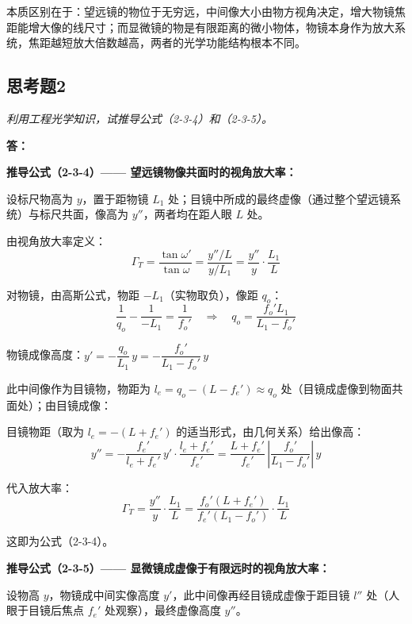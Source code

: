 \documentclass[12pt, a4paper]{article}
\begin{document}
本质区别在于：望远镜的物位于无穷远，中间像大小由物方视角决定，增大物镜焦距能增大像的线尺寸；而显微镜的物是有限距离的微小物体，物镜本身作为放大系统，焦距越短放大倍数越高，两者的光学功能结构根本不同。

\subsection*{思考题2}

\textit{利用工程光学知识，试推导公式（2-3-4）和（2-3-5）。}

\textbf{答：}

\textbf{推导公式（2-3-4）—— 望远镜物像共面时的视角放大率：}

设标尺物高为 $y$，置于距物镜 $L_1$ 处；目镜中所成的最终虚像（通过整个望远镜系统）与标尺共面，像高为 $y''$，两者均在距人眼 $L$ 处。

由视角放大率定义：
\begin{equation*}
  \Gamma_T = \frac{\tan\omega'}{\tan\omega} = \frac{y''/L}{y/L_1} = \frac{y''}{y}\cdot\frac{L_1}{L}
\end{equation*}

对物镜，由高斯公式，物距 $-L_1$（实物取负），像距 $q_o$：
\begin{equation*}
  \frac{1}{q_o} - \frac{1}{-L_1} = \frac{1}{f_o'} \quad\Rightarrow\quad q_o = \frac{f_o' L_1}{L_1 - f_o'}
\end{equation*}

物镜成像高度：$y' = -\dfrac{q_o}{L_1}\,y = -\dfrac{f_o'}{L_1 - f_o'}\,y$

此中间像作为目镜物，物距为 $l_e = q_o - (L - f_e') \approx q_o$ 处（目镜成虚像到物面共面处）；由目镜成像：

目镜物距（取为 $l_e = -(L+f_e')$ 的适当形式，由几何关系）给出像高：
\begin{equation*}
  y'' = -\frac{f_e'}{l_e + f_e'}\,y' \cdot\frac{l_e + f_e'}{f_e'} = \frac{L+f_e'}{f_e'}\,\left|\frac{f_o'}{L_1-f_o'}\right|\,y
\end{equation*}

代入放大率：
\begin{equation*}
  \Gamma_T = \frac{y''}{y}\cdot\frac{L_1}{L}
           = \frac{f_o'(L+f_e')}{f_e'(L_1-f_o')}\cdot\frac{L_1}{L}
\end{equation*}

这即为公式（2-3-4）。

\textbf{推导公式（2-3-5）—— 显微镜成虚像于有限远时的视角放大率：}

设物高 $y$，物镜成中间实像高度 $y'$，此中间像再经目镜成虚像于距目镜 $l''$ 处（人眼于目镜后焦点 $f_e'$ 处观察），最终虚像高度 $y''$。
\end{document}
